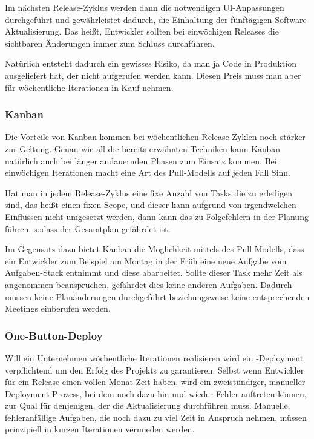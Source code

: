 Im nächsten Release-Zyklus werden dann die notwendigen UI-Anpassungen durchgeführt und gewährleistet dadurch, die Einhaltung der fünftägigen Software-Aktualisierung. Das heißt, Entwickler sollten bei einwöchigen Releases die sichtbaren Änderungen immer zum Schluss durchführen.

Natürlich entsteht dadurch ein gewisses Risiko, da man ja Code in Produktion ausgeliefert hat, der nicht aufgerufen werden kann. Diesen Preis muss man aber für wöchentliche Iterationen in Kauf nehmen.

\subsubsection{Kanban}
Die Vorteile von Kanban kommen bei wöchentlichen Release-Zyklen noch stärker zur Geltung. Genau wie all die bereits erwähnten Techniken kann Kanban natürlich auch bei länger andauernden Phasen zum Einsatz kommen. Bei einwöchigen Iterationen macht eine Art des Pull-Modells auf jeden Fall Sinn. 

Hat man in jedem Release-Zyklus eine fixe Anzahl von Tasks die zu erledigen sind, das heißt einen fixen Scope, und dieser kann aufgrund von irgendwelchen Einflüssen nicht umgesetzt werden, dann kann das zu Folgefehlern in der Planung führen, sodass der Gesamtplan gefährdet ist. 

Im Gegensatz dazu bietet Kanban die Möglichkeit mittels des Pull-Modells, dass ein Entwickler zum Beispiel am Montag in der Früh eine neue Aufgabe vom Aufgaben-Stack entnimmt und diese abarbeitet. Sollte dieser Task mehr Zeit als angenommen beanspruchen, gefährdet dies keine anderen Aufgaben. Dadurch müssen keine Planänderungen durchgeführt beziehungsweise keine entsprechenden Meetings einberufen werden.

\subsubsection{One-Button-Deploy}
Will ein Unternehmen wöchentliche Iterationen realisieren wird ein -Deployment verpflichtend um den Erfolg des Projekts zu garantieren. Selbst wenn Entwickler für ein Release einen vollen Monat Zeit haben, wird ein zweistündiger, manueller Deployment-Prozess, bei dem noch dazu hin und wieder Fehler auftreten können, zur Qual für denjenigen, der die Aktualisierung durchführen muss. Manuelle, fehleranfällige Aufgaben, die noch dazu zu viel Zeit in Anspruch nehmen, müssen prinzipiell in kurzen Iterationen vermieden werden.

